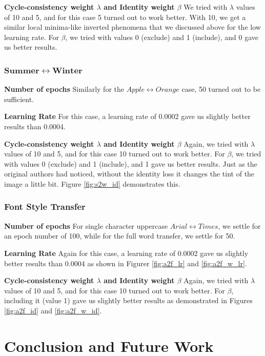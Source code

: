 \documentclass[10pt,twocolumn,letterpaper]{article}
\begin{document}
\noindent\textbf{Cycle-consistency weight $\lambda$ and Identity weight $\beta$} We tried with $\lambda$
values of 10 and 5, and for this case 5 turned out to work better. With 10, we get a similar local minima-like inverted phenomena that we discussed above for the low learning rate. For $\beta$, we tried 
with values 0 (exclude) and 1 (include), and 0 gave us better results.

\subsubsection{$\mathbf{Summer \leftrightarrow Winter}$}
\noindent\textbf{Number of epochs} Similarly for the $Apple \leftrightarrow Orange$ case, 50 turned out to be sufficient.

\noindent\textbf{Learning Rate} For this case, a learning rate of 0.0002 gave us slightly better results than 0.0004.

\noindent\textbf{Cycle-consistency weight $\lambda$ and Identity weight $\beta$} Again, we tried with 
$\lambda$ values of 10 and 5, and for this case 10 turned out to work better. For $\beta$, we tried 
with values 0 (exclude) and 1 (include), and 1 gave us better results. Just as the original authors \cite{cyclegan} had noticed, without the identity loss it changes the tint of the image a little bit. Figure \ref{fig:s2w_id} demonstrates this. 

\subsubsection{Font Style Transfer}
\noindent\textbf{Number of epochs} For single character uppercase $Arial \leftrightarrow Times$, we settle for an epoch number of 100, while for the full word transfer, we settle for 50.

\noindent\textbf{Learning Rate} Again for this case, a learning rate of 0.0002 gave us slightly better results than 0.0004 as shown in Figurer \ref{fig:a2f_lr} and \ref{fig:a2f_w_lr}.

\noindent\textbf{Cycle-consistency weight $\lambda$ and Identity weight $\beta$} Again, we tried with 
$\lambda$ values of 10 and 5, and for this case 10 turned out to work better. For $\beta$, including it (value 1) gave us slightly better results as demonstrated in Figures \ref{fig:a2f_id} and \ref{fig:a2f_w_id}.

\section{Conclusion and Future Work}
\end{document}
